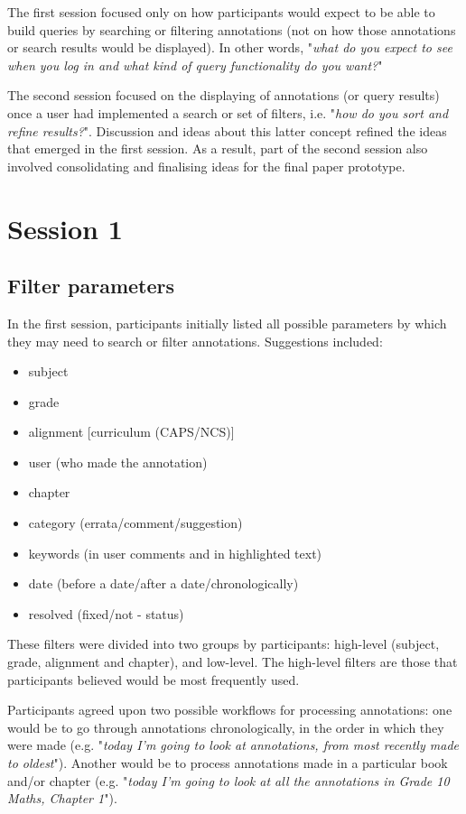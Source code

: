 The first session focused only on how participants would expect to be able to build queries by searching or filtering annotations (not on how those annotations or search results would be displayed). In other words, "\textit{what do you expect to see when you log in and what kind of query functionality do you want?}"

The second session focused on the displaying of annotations (or query results) once a user had implemented a search or set of filters, i.e. "\textit{how do you sort and refine results?}". Discussion and ideas about this latter concept refined the ideas that emerged in the first session. As a result, part of the second session also involved consolidating and finalising ideas for the final paper prototype.

\section{Session 1}

\subsection{Filter parameters}
In the first session, participants initially listed all possible parameters by which they may need to search or filter annotations. Suggestions included:
\begin{itemize}
\item subject
\item grade
\item alignment [curriculum (CAPS/NCS)]
\item user (who made the annotation)
\item chapter
\item category (errata/comment/suggestion)
\item keywords (in user comments and in highlighted text)
\item date (before a date/after a date/chronologically)
\item resolved (fixed/not - status)
\end{itemize}

These filters were divided into two groups by participants: high-level (subject, grade, alignment and chapter), and low-level. The high-level filters are those that participants believed would be most frequently used. 

Participants agreed upon two possible workflows for processing annotations: one would be to go through annotations chronologically, in the order in which they were made (e.g. "\textit{today I'm going to look at annotations, from most recently made to oldest}"). Another would be to process annotations made in a particular book and/or chapter (e.g. "\textit{today I'm going to look at all the annotations in Grade 10 Maths, Chapter 1}").

